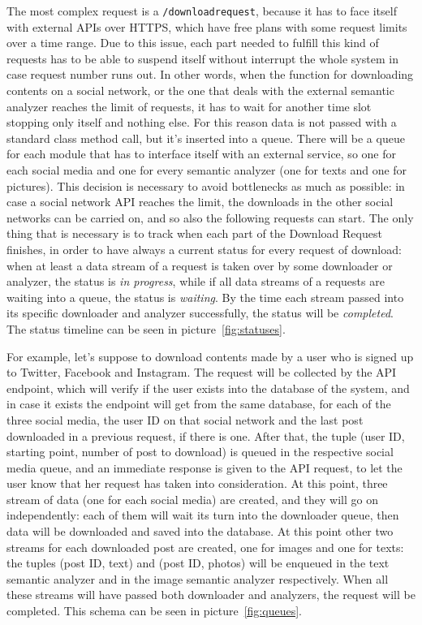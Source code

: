 The most complex request is a \texttt{/downloadrequest}, because it has to face itself with external APIs over HTTPS, which have free plans with some request limits over a time range. Due to this issue, each part needed to fulfill this kind of requests has to be able to suspend itself without interrupt the whole system in case request number runs out. In other words, when the function for downloading contents on a social network, or the one that deals with the external semantic analyzer reaches the limit of requests, it has to wait for another time slot stopping only itself and nothing else. For this reason data is not passed with a standard class method call, but it's inserted into a queue. There will be a queue for each module that has to interface itself with an external service, so one for each social media and one for every semantic analyzer (one for texts and one for pictures). This decision is necessary to avoid bottlenecks as much as possible: in case a social network API reaches the limit, the downloads in the other social networks can be carried on, and so also the following requests can start. The only thing that is necessary is to track when each part of the Download Request finishes, in order to have always a current status for every request of download: when at least a data stream of a request is taken over by some downloader or analyzer, the status is \emph{in progress}, while if all data streams of a requests are waiting into a queue, the status is \emph{waiting}. By the time each stream passed into its specific downloader and analyzer successfully, the status will be \emph{completed}. The status timeline can be seen in picture~\ref{fig:statuses}.

For example, let's suppose to download contents made by a user who is signed up to Twitter, Facebook and Instagram. The request will be collected by the API endpoint, which will verify if the user exists into the database of the system, and in case it exists the endpoint will get from the same database, for each of the three social media, the user ID on that social network and the last post downloaded in a previous request, if there is one. After that, the tuple (user ID, starting point, number of post to download) is queued in the respective social media queue, and an immediate response is given to the API request, to let the user know that her request has taken into consideration. At this point, three stream of data (one for each social media) are created, and they will go on independently: each of them will wait its turn into the downloader queue, then data will be downloaded and saved into the database. At this point other two streams for each downloaded post are created, one for images and one for texts: the tuples (post ID, text) and (post ID, photos) will be enqueued in the text semantic analyzer and in the image semantic analyzer respectively. When all these streams will have passed both downloader and analyzers, the request will be completed. This schema can be seen in picture~\ref{fig:queues}.

